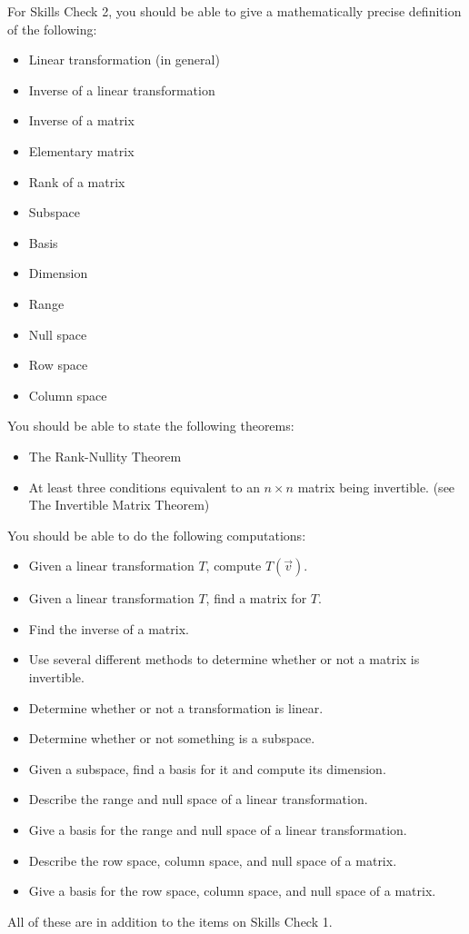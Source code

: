 \documentclass[10pt]{article}
\begin{document}
For Skills Check 2, you should be able to give a mathematically precise definition of the following:
\begin{itemize}	
	\item Linear transformation (in general)
	\item Inverse of a linear transformation
	\item Inverse of a matrix
	\item Elementary matrix
	\item Rank of a matrix
	\item Subspace
	\item Basis
	\item Dimension
	\item Range
	\item Null space
	\item Row space
	\item Column space
\end{itemize}

You should be able to state the following theorems:
\begin{itemize}
	\item The Rank-Nullity Theorem
	\item At least three conditions equivalent to an $n\times n$ matrix being invertible.
		(see The Invertible Matrix Theorem)
\end{itemize}

You should be able to do the following computations:
\begin{itemize}	
	\item Given a linear transformation $T$, compute $T(\vec{v})$.
	\item Given a linear transformation $T$, find a matrix for $T$.
	\item Find the inverse of a matrix.
	\item Use several different methods to determine whether or not a matrix is invertible.
	\item Determine whether or not a transformation is linear.
	\item Determine whether or not something is a subspace.
	\item Given a subspace, find a basis for it and compute its dimension.
	\item Describe the range and null space of a linear transformation.
	\item Give a basis for the range and null space of a linear transformation.
	\item Describe the row space, column space, and null space of a matrix.
	\item Give a basis for the row space, column space, and null space of a matrix.
\end{itemize}

All of these are in addition to the items on Skills Check 1.
\end{document}
